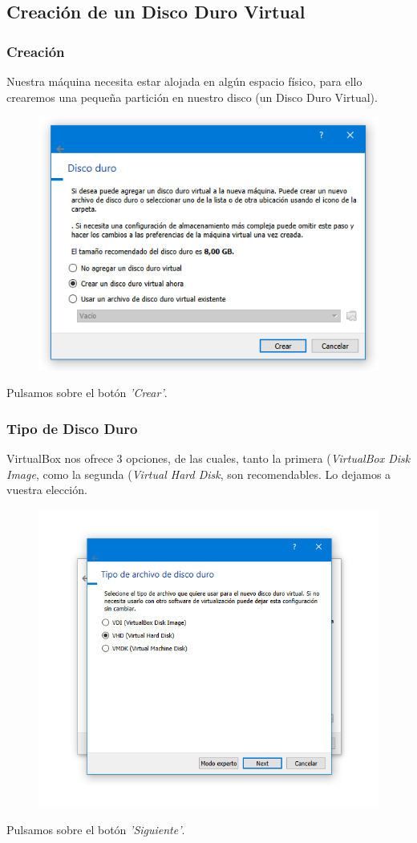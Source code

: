 \subsection{Creación de un Disco Duro Virtual}
\noindent
\subsubsection{Creación}
Nuestra máquina necesita estar alojada en algún espacio físico, para ello crearemos una pequeña partición en nuestro disco (un Disco Duro Virtual).
\begin{figure}[H]
        \centering
        \includegraphics[width= 0.7 \textwidth]{Media/VB4.png}
    \end{figure}
\newline \noindent Pulsamos sobre el botón \textit{'Crear'}.

\subsubsection{Tipo de Disco Duro}
\noindent
VirtualBox nos ofrece 3 opciones, de las cuales, tanto la primera (\textit{VirtualBox Disk Image}, como la segunda (\textit{Virtual Hard Disk}, son recomendables. Lo dejamos a vuestra elección.
\begin{figure}[H]
        \centering
        \includegraphics[width= 0.7 \textwidth]{Media/VB5.png}
    \end{figure}
\newline \noindent Pulsamos sobre el botón \textit{'Siguiente'}.

